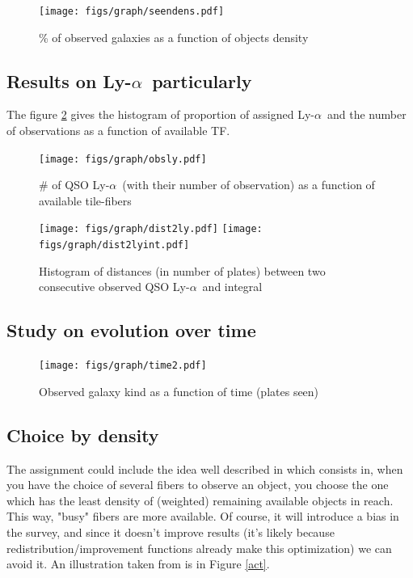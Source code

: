 \documentclass{article}
\def\lya{Ly-$\alpha$\ }
\begin{document}
\begin{figure}[H]\begin{center}
	\texttt{[image: figs/graph/seendens.pdf]}
	\caption{\% of observed galaxies as a function of objects density}\label{seendens}
\end{center}\end{figure}


\subsection{Results on \lya particularly}
The figure \ref{histastf} gives the histogram of proportion of assigned \lya and the number of observations as a function of available TF.

\begin{figure}[H]\begin{center}
	\texttt{[image: figs/graph/obsly.pdf]}
	\caption{\# of QSO \lya (with their number of observation) as a function of available tile-fibers}\label{histastf}
\end{center}\end{figure}

\begin{figure}[H]\begin{center}
	\texttt{[image: figs/graph/dist2ly.pdf]}
	\texttt{[image: figs/graph/dist2lyint.pdf]}\hfill
	\caption{Histogram of distances (in number of plates) between two consecutive observed QSO \lya and integral}
\end{center}\end{figure}

\subsection{Study on evolution over time}

\begin{figure}[H]\begin{center}
	\texttt{[image: figs/graph/time2.pdf]}
	\caption{Observed galaxy kind as a function of time (plates seen)}
\end{center}\end{figure}

\subsection{Choice by density}
The assignment could include the idea well described in \cite{fa} which consists in, when you have the choice of several fibers to observe an object, you choose the one which has the least density of (weighted) remaining available objects in reach. This way, "busy" fibers are more available. Of course, it will introduce a bias in the survey, and since it doesn't improve results (it's likely because redistribution/improvement functions already make this optimization) we can avoid it. An illustration taken from \cite{fa} is in Figure \ref{act}.
\end{document}
